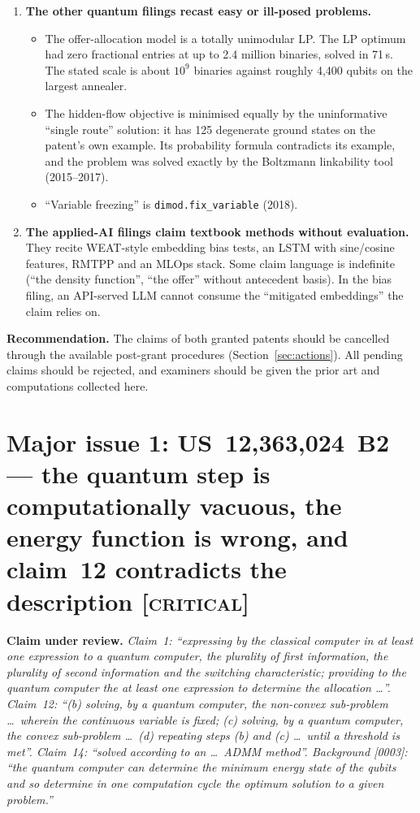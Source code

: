 \documentclass[10pt,a4paper]{article}
\newcommand{\claim}[1]{\noindent\textbf{Claim under review.} \emph{#1}\par\smallskip}
\newcommand{\sev}[1]{\textsc{\color{BrickRed}[#1]}}
\begin{document}
\begin{enumerate}[label=\textbf{\arabic*.}]
  \item \textbf{The other quantum filings recast easy or ill-posed problems.}
  \begin{itemize}
    \item The offer-allocation model is a totally unimodular LP. The LP optimum had zero fractional entries at up to 2.4 million binaries, solved in 71\,s. The stated scale is about $10^9$ binaries against roughly 4,400 qubits on the largest annealer.
    \item The hidden-flow objective is minimised equally by the uninformative ``single route'' solution: it has 125 degenerate ground states on the patent's own example. Its probability formula contradicts its example, and the problem was solved exactly by the Boltzmann linkability tool (2015--2017).
    \item ``Variable freezing'' is \texttt{dimod.fix\_variable} (2018).
  \end{itemize}
  \item \textbf{The applied-AI filings claim textbook methods without evaluation.} They recite WEAT-style embedding bias tests, an LSTM with sine/cosine features, RMTPP and an MLOps stack. Some claim language is indefinite (``the density function'', ``the offer'' without antecedent basis). In the bias filing, an API-served LLM cannot consume the ``mitigated embeddings'' the claim relies on.
\end{enumerate}
\noindent\textbf{Recommendation.} The claims of both granted patents should be cancelled through the available post-grant procedures (Section~\ref{sec:actions}). All pending claims should be rejected, and examiners should be given the prior art and computations collected here.

\section{Major issue 1: US~12,363,024~B2 --- the quantum step is computationally vacuous, the energy function is wrong, and claim~12 contradicts the description \sev{critical}}\label{sec:switching}
\claim{Claim~1: ``expressing by the classical computer in at least one expression to a quantum computer, the plurality of first information, the plurality of second information and the switching characteristic; providing to the quantum computer the at least one expression to determine the allocation \ldots''. Claim~12: ``(b) solving, by a quantum computer, the non-convex sub-problem \ldots\ wherein the continuous variable is fixed; (c) solving, by a quantum computer, the convex sub-problem \ldots\ (d) repeating steps (b) and (c) \ldots\ until a threshold is met''. Claim~14: ``solved according to an \ldots\ ADMM method''. Background [0003]: ``the quantum computer can determine the minimum energy state of the qubits and so determine in one computation cycle the optimum solution to a given problem.''}
\end{document}

